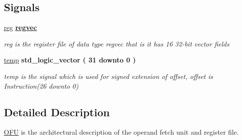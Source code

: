 \subsection*{Signals}
 \begin{DoxyCompactItemize}
\item 
\hypertarget{class_o_f_unit_1_1_o_f_u_aad72c6f18f2ed17dab71807f9fcf8778}{\hyperlink{class_o_f_unit_1_1_o_f_u_aad72c6f18f2ed17dab71807f9fcf8778}{reg} {\bfseries {\bfseries \hyperlink{class_o_f_unit_1_1_o_f_u_a7214ee86d8486f4a264c9251cb623069}{regvec}} \textcolor{vhdlchar}{ }} }\label{class_o_f_unit_1_1_o_f_u_aad72c6f18f2ed17dab71807f9fcf8778}

\begin{DoxyCompactList}\small\item\em reg is the register file of data type regvec that is it has 16 32-\/bit vector fields \end{DoxyCompactList}\item 
\hypertarget{class_o_f_unit_1_1_o_f_u_a981d141369765d0e214128c4f3d8ecbb}{\hyperlink{class_o_f_unit_1_1_o_f_u_a981d141369765d0e214128c4f3d8ecbb}{temp} {\bfseries \textcolor{comment}{std\-\_\-logic\-\_\-vector}\textcolor{vhdlchar}{ }\textcolor{vhdlchar}{(}\textcolor{vhdlchar}{ } \textcolor{vhdldigit}{31} \textcolor{vhdlchar}{ }\textcolor{vhdlchar}{ }\textcolor{vhdlchar}{ }\textcolor{vhdlkeyword}{downto}\textcolor{vhdlchar}{ }\textcolor{vhdlchar}{ }\textcolor{vhdlchar}{ } \textcolor{vhdldigit}{0} \textcolor{vhdlchar}{ }\textcolor{vhdlchar}{)}\textcolor{vhdlchar}{ }} }\label{class_o_f_unit_1_1_o_f_u_a981d141369765d0e214128c4f3d8ecbb}

\begin{DoxyCompactList}\small\item\em temp is the signal which is used for signed extension of offset, offset is Instruction(26 downto 0) \end{DoxyCompactList}\end{DoxyCompactItemize}


\subsection{Detailed Description}
\hyperlink{class_o_f_unit_1_1_o_f_u}{O\-F\-U} is the architectural description of the operand fetch unit and register file. 

